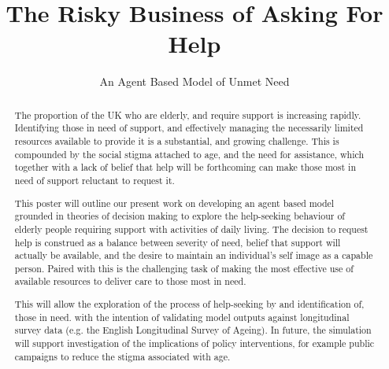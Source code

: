 \documentclass{article}
\date{\vspace{-5ex}}
\begin{document}
\title{The Risky Business of Asking For Help}
\subtitle{An Agent Based Model of Unmet Need}

\begin{abstract}
The proportion of the UK who are elderly, and require support is increasing rapidly. Identifying those in need of support, and effectively managing the necessarily limited resources available to provide it is a substantial, and growing challenge. This is compounded by the social stigma attached to age, and the need for assistance, which together with a lack of belief that help will be forthcoming can make those most in need of support reluctant to request it.



This poster will outline our present work on developing an agent based model grounded in theories of decision making to explore the help-seeking behaviour of elderly people requiring support with activities of daily living.  
The decision to request help is construed as a balance between severity of need, belief that support will actually be available, and the desire to maintain an individual's self image as a capable person. Paired with this is the challenging task of making the most effective use of available resources to deliver care to those most in need.

This will allow the exploration of the process of help-seeking by and identification of, those in need. with the intention of validating model outputs against longitudinal survey data (e.g. the English Longitudinal Survey of Ageing). In future, the simulation will support investigation of the implications of policy interventions, for example public campaigns to reduce the stigma associated with age.
\end{abstract}
\end{document}
